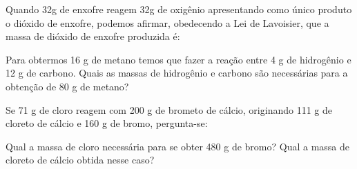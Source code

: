 \documentclass[10pt]{scrartcl}
\date{\today}
\title{}
\def\disciplina{Química}
\begin{document}
\twocolumn[

%




%

\smallbreak
\medbreak
\par\vspace{2ex}]%







\begin{exercise}
Quando 32g de enxofre reagem 32g de oxigênio apresentando como único
produto o dióxido de enxofre, podemos afirmar, obedecendo a Lei de Lavoisier,
que a massa de dióxido de enxofre produzida é:
\end{exercise}




\begin{exercise}
Para obtermos 16 g de metano temos que fazer a reação entre 4 g de
hidrogênio e 12 g de carbono. Quais as massas de hidrogênio e carbono são
necessárias para a obtenção de 80 g de metano?
\end{exercise}




\begin{exercise}
Se 71 g de cloro reagem com 200 g de brometo de cálcio, originando 111 g
de cloreto de cálcio e 160 g de bromo, pergunta-se:

\begin{choice}
\choice Qual a massa de cloro necessária para se obter 480 g de bromo?
\choice  Qual a massa de cloreto de cálcio obtida nesse caso?
\end{choice}
\end{exercise}
\end{document}
